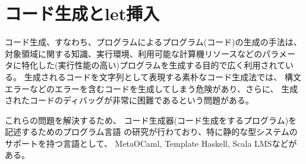 
\section{コード生成とlet挿入}

コード生成、すなわち、プログラムによるプログラム(コード)の生成の手法は、
対象領域に関する知識、実行環境、利用可能な計算機リソースなどのパラメー
タに特化した(実行性能の高い)プログラムを生成する目的で広く利用されている。
生成されるコードを文字列として表現する素朴なコード生成法では、
構文エラーなどのエラーを含むコードを生成してしまう危険があり、さらに、
生成されたコードのディバッグが非常に困難であるという問題がある。

これらの問題を解決するため、
コード生成器(コード生成をするプログラム)を記述するためのプログラム言語
の研究が行わており、特に静的な型システムのサポートを持つ言語として、
MetaOCaml, Template Haskell, Scala LMSなどがある。



